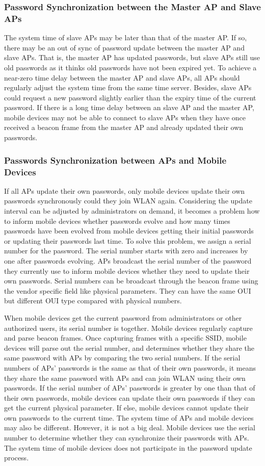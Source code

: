 \subsubsection{Password Synchronization between the Master AP and Slave APs}
The system time of slave APs may be later than that of the master AP. If so, there may be an out of sync of password update between the master AP and slave APs. That is, the master AP has updated passwords, but slave APs still use old passwords as it thinks old passwords have not been expired yet. To achieve a near-zero time delay between the master AP and slave APs, all APs should regularly adjust the system time from the same time server. Besides, slave APs could request a new password slightly earlier than the expiry time of the current password. If there is a long time delay between an slave AP and the master AP, mobile devices may not be able to connect to slave APs when they have once received a beacon frame from the master AP and already updated their own passwords. 

\subsubsection{Passwords Synchronization between APs and Mobile Devices}
If all APs update their own passwords, only mobile devices update their own passwords synchronously could they join WLAN again. Considering the update interval can be adjusted by administrators on demand, it becomes a problem how to inform mobile devices whether passwords evolve and how many times passwords have been evolved from mobile devices getting their initial passwords or updating their passwords last time. To solve this problem, we assign a serial number for the password. The serial number starts with zero and increases by one after passwords evolving. APs broadcast the serial number of the password they currently use to inform mobile devices whether they need to update their own passwords. Serial numbers can be broadcast through the beacon frame using the vendor specific field like physical parameters. They can have the same OUI but different OUI type compared with physical numbers. 

When mobile devices get the current password from administrators or other authorized users, its serial number is together. Mobile devices regularly capture and parse beacon frames. Once capturing frames with a specific SSID, mobile devices will parse out the serial number, and determines whether they share the same password with APs by comparing the two serial numbers. If the serial numbers of APs’ passwords is the same as that of their own passwords, it means they share the same password with APs and can join WLAN using their own passwords. If the serial number of APs’ passwords is greater by one than that of their own passwords, mobile devices can update their own passwords if they can get the current physical parameter. If else, mobile devices cannot update their own passwords to the current time. The system time of APs and mobile devices may also be different. However, it is not a big deal. Mobile devices use the serial number to determine whether they can synchronize their passwords with APs. The system time of mobile devices does not participate in the password update process. 

